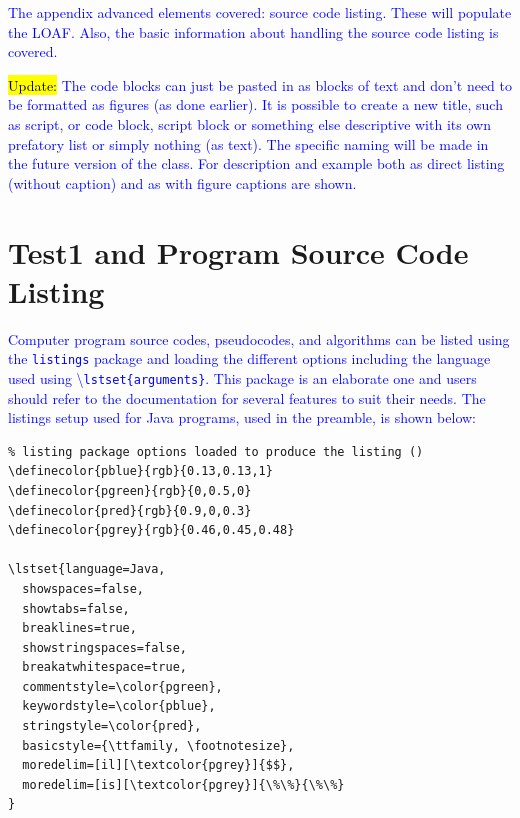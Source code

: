 \documentclass[phd]{ndsu-thesis-2022}
\newcommand\italk[1]{\textcolor{blue}{#1}}  %
\newcommand\cmd[1]{\textbackslash\texttt{#1}}  %
\newcommand\vb[1]{\textcolor{blue}{\texttt{#1}}}%
\begin{document}
\begin{landscape}
\end{landscape}




\italk{The appendix advanced elements covered: source code listing. These will populate the LOAF. Also, the basic information about handling the source code listing is covered. }

\italk{\hl{Update:} The code blocks can just be pasted in as blocks of text and don't need to be formatted as figures (as done earlier). It is possible to create a new title, such as script, or code block, script block or something else descriptive with its own prefatory list or simply nothing (as text). The specific naming will be made in the future version of the class. For description and example both as direct listing (without caption) and as with figure captions are shown. 
}

\section{Test1 and Program Source Code Listing}
\italk{Computer program source codes, pseudocodes, and algorithms can be listed using the \vb{listings} package and loading the different options including the language used using \cmd{lstset\{arguments\}}. This package is an elaborate one and users should refer to the documentation for several features to suit their needs. The listings setup used for Java programs, used in the preamble, is shown below:}

{\small
\singlespacing
\begin{verbatim}
% listing package options loaded to produce the listing ()
\definecolor{pblue}{rgb}{0.13,0.13,1}
\definecolor{pgreen}{rgb}{0,0.5,0}
\definecolor{pred}{rgb}{0.9,0,0.3}
\definecolor{pgrey}{rgb}{0.46,0.45,0.48}

\lstset{language=Java, 
  showspaces=false,
  showtabs=false,
  breaklines=true,
  showstringspaces=false,
  breakatwhitespace=true,
  commentstyle=\color{pgreen},
  keywordstyle=\color{pblue},
  stringstyle=\color{pred},
  basicstyle={\ttfamily, \footnotesize},
  moredelim=[il][\textcolor{pgrey}]{$$},
  moredelim=[is][\textcolor{pgrey}]{\%\%}{\%\%}
}
\end{verbatim}
}
\end{document}
